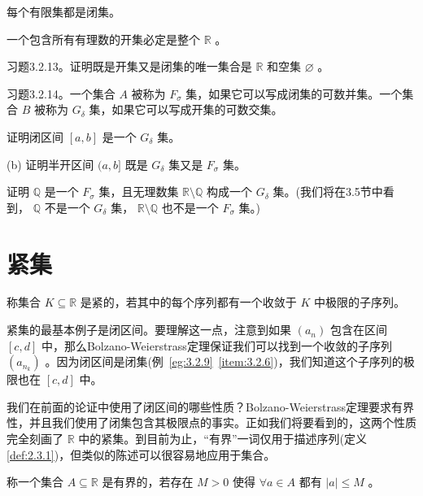 每个有限集都是闭集。

一个包含所有有理数的开集必定是整个 \(\mathbb{R}\) 。

习题3.2.13。证明既是开集又是闭集的唯一集合是 \(\mathbb{R}\) 和空集 \(\varnothing\) 。

习题3.2.14。一个集合 \(A\) 被称为 \({F}_{\sigma }\) 集，如果它可以写成闭集的可数并集。一个集合 \(B\) 被称为 \({G}_{\delta }\) 集，如果它可以写成开集的可数交集。

证明闭区间 \(\left\lbrack  {a,b}\right\rbrack\) 是一个 \({G}_{\delta }\) 集。

(b) 证明半开区间 \((a,b\rbrack\) 既是 \({G}_{\delta }\) 集又是 \({F}_{\sigma }\) 集。

证明 \(\mathbb{Q}\) 是一个 \({F}_{\sigma }\) 集，且无理数集 \(\mathbb{R}\setminus\mathbb{Q}\) 构成一个 \({G}_{\delta }\) 集。(我们将在3.5节中看到， \(\mathbb{Q}\) 不是一个 \({G}_{\delta }\) 集， \(\mathbb{R}\setminus\mathbb{Q}\) 也不是一个 \({F}_{\sigma }\) 集。)

\section{紧集}
\label{sec:3.3}
\begin{Def}
  \label{def:3.3.1}
  称集合 \(K \subseteq  \mathbb{R}\) 是紧的，若其中的每个序列都有一个收敛于 \(K\) 中极限的子序列。
\end{Def}

\begin{Eg}
  \label{eg:3.3.2}
  紧集的最基本例子是闭区间。要理解这一点，注意到如果 \(\left( {a}_{n}\right)\) 包含在区间 \(\left\lbrack  {c,d}\right\rbrack\) 中，那么Bolzano-Weierstrass定理保证我们可以找到一个收敛的子序列 \(\left( {a}_{{n}_{k}}\right)\) 。因为闭区间是闭集(例~\ref{eg:3.2.9}~\ref{item:3.2.6})，我们知道这个子序列的极限也在 \(\left\lbrack  {c,d}\right\rbrack\) 中。
\end{Eg}


我们在前面的论证中使用了闭区间的哪些性质？Bolzano-Weierstrass定理要求有界性，并且我们使用了闭集包含其极限点的事实。正如我们将要看到的，这两个性质完全刻画了 \(\mathbb{R}\) 中的紧集。到目前为止，“有界”一词仅用于描述序列(定义\ref{def:2.3.1})，但类似的陈述可以很容易地应用于集合。

\begin{Def}
  \label{def:3.3.3}
  称一个集合 \(A \subseteq  \mathbb{R}\) 是有界的，若存在 \(M > 0\) 使得 \(\forall a \in  A\) 都有 \(\left| a\right|  \leq  M\) 。
\end{Def}



